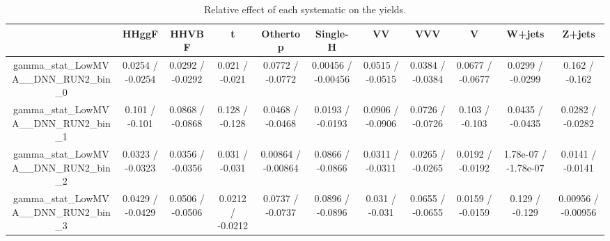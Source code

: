 \documentclass[10pt]{article}
\begin{document}
\begin{table}[htbp]
\begin{center}
\begin{tabular}{|c|c|c|c|c|c|c|c|c|c|c|}
\hline 
      & HHggF      & HHVBF      & t      & Othertop      & Single-H      & VV      & VVV      & V      & W+jets      & Z+jets \\ 
\hline 
  gamma_stat_LowMVA__DNN_RUN2_bin_0 & 0.0254 / -0.0254 & 0.0292 / -0.0292 & 0.021 / -0.021 & 0.0772 / -0.0772 & 0.00456 / -0.00456 & 0.0515 / -0.0515 & 0.0384 / -0.0384 & 0.0677 / -0.0677 & 0.0299 / -0.0299 & 0.162 / -0.162 \\ 
  gamma_stat_LowMVA__DNN_RUN2_bin_1 & 0.101 / -0.101 & 0.0868 / -0.0868 & 0.128 / -0.128 & 0.0468 / -0.0468 & 0.0193 / -0.0193 & 0.0906 / -0.0906 & 0.0726 / -0.0726 & 0.103 / -0.103 & 0.0435 / -0.0435 & 0.0282 / -0.0282 \\ 
  gamma_stat_LowMVA__DNN_RUN2_bin_2 & 0.0323 / -0.0323 & 0.0356 / -0.0356 & 0.031 / -0.031 & 0.00864 / -0.00864 & 0.0866 / -0.0866 & 0.0311 / -0.0311 & 0.0265 / -0.0265 & 0.0192 / -0.0192 & 1.78e-07 / -1.78e-07 & 0.0141 / -0.0141 \\ 
  gamma_stat_LowMVA__DNN_RUN2_bin_3 & 0.0429 / -0.0429 & 0.0506 / -0.0506 & 0.0212 / -0.0212 & 0.0737 / -0.0737 & 0.0896 / -0.0896 & 0.031 / -0.031 & 0.0655 / -0.0655 & 0.0159 / -0.0159 & 0.129 / -0.129 & 0.00956 / -0.00956 \\ 
\hline 
\end{tabular} 
\caption{Relative effect of each systematic on the yields.} 
\end{center} 
\end{table} 
\end{document}
